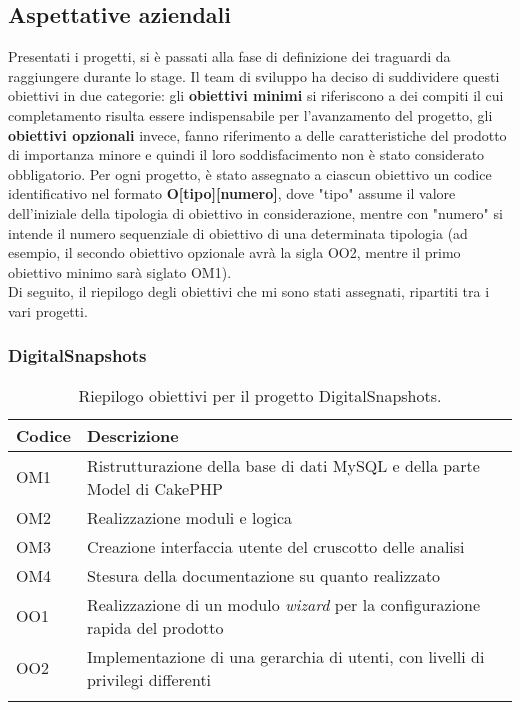 \subsection{Aspettative aziendali}
\label{subsec:aspettative-aziendali}
Presentati i progetti, si è passati alla fase di definizione dei traguardi da raggiungere durante lo stage.
Il team di sviluppo ha deciso di suddividere questi obiettivi in due categorie: gli \textbf{obiettivi minimi} si riferiscono a dei compiti il cui completamento risulta essere indispensabile per l'avanzamento del progetto, gli \textbf{obiettivi opzionali} invece, fanno riferimento a delle caratteristiche del prodotto di importanza minore e quindi il loro soddisfacimento non è stato considerato obbligatorio.
Per ogni progetto, è stato assegnato a ciascun obiettivo un codice identificativo nel formato \textbf{O[tipo][numero]}, dove "tipo" assume il valore dell'iniziale della tipologia di obiettivo in considerazione, mentre con "numero" si intende il numero sequenziale di obiettivo di una determinata tipologia (ad esempio, il secondo obiettivo opzionale avrà la sigla OO2, mentre il primo obiettivo minimo sarà siglato OM1). \\
Di seguito, il riepilogo degli obiettivi che mi sono stati assegnati, ripartiti tra i vari progetti.
\subsubsection*{DigitalSnapshots}
\begin{center}
	\renewcommand{\arraystretch}{1.5}
	\begin{longtable}{ | p{0.1\linewidth} | p{0.9\linewidth} |}	 
		\hline   
	    \rowcolor{header}\textbf{Codice}&\textbf{Descrizione}\\
		\hline    	
    	OM1 & Ristrutturazione della base di dati MySQL e della parte Model di CakePHP \\
    	OM2 & Realizzazione moduli \markg{\acrshort{api}} e logica \\
    	OM3 & Creazione interfaccia utente del cruscotto delle analisi \\
    	OM4 & Stesura della documentazione su quanto realizzato \\
    	OO1 & Realizzazione di un modulo \textit{wizard} per la configurazione rapida del prodotto \\
    	OO2 & Implementazione di una gerarchia di utenti, con livelli di privilegi differenti \\
    	\hline
		\rowcolor{white}    	
    	\caption{Riepilogo obiettivi per il progetto DigitalSnapshots.}
	\end{longtable}
	\label{tab:obiettivi-digitalsnapshots}
\end{center}

